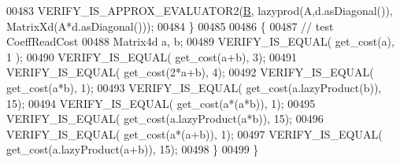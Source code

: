 \begin{DoxyCode}
00483     VERIFY\_IS\_APPROX\_EVALUATOR2(\hyperlink{group___core___module_class_eigen_1_1_matrix}{B}, lazyprod(A,d.asDiagonal()), MatrixXd(A*d.asDiagonal()));
00484   \}
00485 
00486   \{
00487     \textcolor{comment}{// test CoeffReadCost}
00488     Matrix4d a, b;
00489     VERIFY\_IS\_EQUAL( get\_cost(a), 1 );
00490     VERIFY\_IS\_EQUAL( get\_cost(a+b), 3);
00491     VERIFY\_IS\_EQUAL( get\_cost(2*a+b), 4);
00492     VERIFY\_IS\_EQUAL( get\_cost(a*b), 1);
00493     VERIFY\_IS\_EQUAL( get\_cost(a.lazyProduct(b)), 15);
00494     VERIFY\_IS\_EQUAL( get\_cost(a*(a*b)), 1);
00495     VERIFY\_IS\_EQUAL( get\_cost(a.lazyProduct(a*b)), 15);
00496     VERIFY\_IS\_EQUAL( get\_cost(a*(a+b)), 1);
00497     VERIFY\_IS\_EQUAL( get\_cost(a.lazyProduct(a+b)), 15);
00498   \}
00499 \}
\end{DoxyCode}
